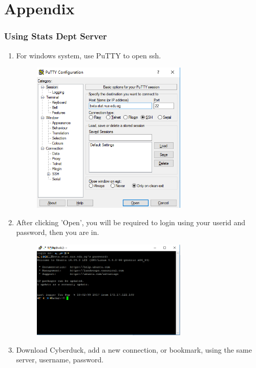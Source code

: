 \documentclass{article}
\begin{document}
	
	
	\newpage
	\section{Appendix}
	\subsubsection*{Using Stats Dept Server}
	\begin{enumerate}
		\item For windows system, use PuTTY to open ssh.
		\begin{figure}[H]
			\centering
			\includegraphics[width=0.7\textwidth]{putty.png}
		\end{figure}
		\item After clicking 'Open', you will be required to login using your userid and password, then you are in.
		\begin{figure}[H]
			\centering
			\includegraphics[width=0.7\textwidth]{ssh.png}
		\end{figure}
		\item Download Cyberduck, add a new connection, or bookmark, using the same server, username, password.

\end{enumerate}
\end{document}
